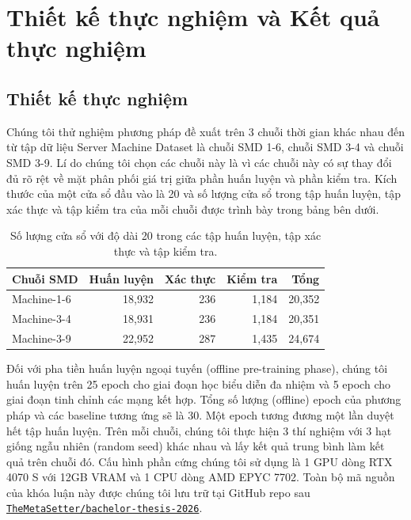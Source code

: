 \chapter{Thiết kế thực nghiệm và Kết quả thực nghiệm}
\label{Chapter4}

\pagebreak
\section{Thiết kế thực nghiệm}
Chúng tôi thử nghiệm phương pháp đề xuất trên 3 chuỗi thời gian khác nhau đến từ tập dữ liệu Server Machine Dataset \cite{10.1145/3292500.3330672} là chuỗi SMD 1-6, chuỗi SMD 3-4 và chuỗi SMD 3-9. Lí do chúng tôi chọn các chuỗi này là vì các chuỗi này có sự thay đổi đủ rõ rệt về mặt phân phối giá trị giữa phần huấn luyện và phần kiểm tra. Kích thước của một cửa sổ đầu vào là 20 và số lượng cửa sổ trong tập huấn luyện, tập xác thực và tập kiểm tra của mỗi chuỗi được trình bày trong bảng bên dưới.

\begin{table}[ht]
\centering
\caption{Số lượng cửa sổ với độ dài 20 trong các tập huấn luyện, tập xác thực và tập kiểm tra.}
\label{tab:smd-window-counts}
\begin{tabular}{lrrrr}
\hline
Chuỗi SMD & Huấn luyện & Xác thực & Kiểm tra & Tổng \\
\hline
Machine-1-6 & 18{,}932 & 236 & 1{,}184 & 20{,}352 \\
Machine-3-4 & 18{,}931 & 236 & 1{,}184 & 20{,}351 \\
Machine-3-9 & 22{,}952 & 287 & 1{,}435 & 24{,}674 \\
\hline
\end{tabular}
\end{table}

Đối với pha tiền huấn luyện ngoại tuyến (offline pre-training phase), chúng tôi huấn luyện trên 25 epoch cho giai đoạn học biểu diễn đa nhiệm và 5 epoch cho giai đoạn tinh chỉnh các mạng kết hợp. Tổng số lượng (offline) epoch của phương pháp và các baseline tương ứng sẽ là 30. Một epoch tương đương một lần duyệt hết tập huấn luyện. Trên mỗi chuỗi, chúng tôi thực hiện 3 thí nghiệm với 3 hạt giống ngẫu nhiên (random seed) khác nhau và lấy kết quả trung bình làm kết quả trên chuỗi đó. Cấu hình phần cứng chúng tôi sử dụng là 1 GPU dòng RTX 4070 S với 12GB VRAM và 1 CPU dòng AMD EPYC 7702. Toàn bộ mã nguồn của khóa luận này được chúng tôi lưu trữ tại GitHub repo sau
\href{https://github.com/TheMetaSetter/bachelor-thesis-2026}
{\texttt{TheMetaSetter/bachelor-thesis-2026}}.

